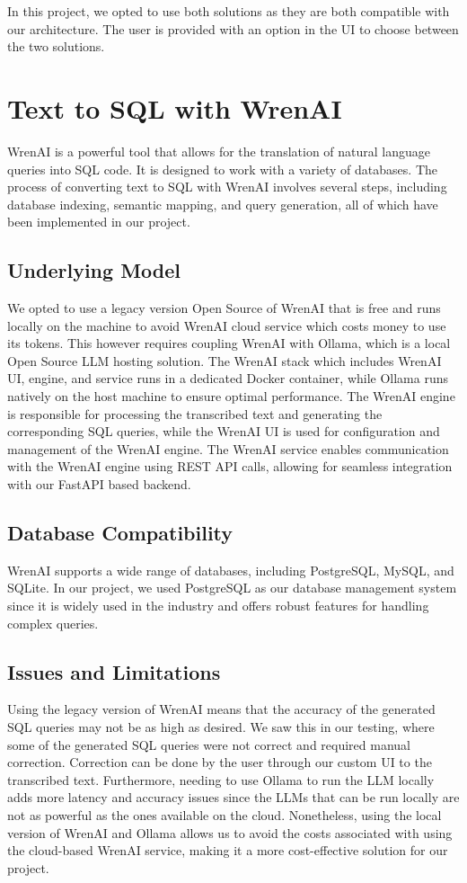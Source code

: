 \documentclass{article}
\begin{document}
In this project, we opted to use both solutions as they are both compatible with our architecture. The user is provided with an option in the UI to choose between the two solutions. 

\section{Text to SQL with WrenAI}
WrenAI is a powerful tool that allows for the translation of natural language queries into SQL code. It is designed to work with a variety of databases. The process of converting text to SQL with WrenAI involves several steps, including database indexing, semantic mapping, and query generation, all of which have been implemented in our project.

\subsection{Underlying Model}
We opted to use a legacy version Open Source of WrenAI that is free and runs locally on the machine to avoid WrenAI cloud service which costs money to use its tokens. This however requires coupling WrenAI with Ollama, which is a local Open Source LLM hosting solution. The WrenAI stack which includes WrenAI UI, engine, and service runs in a dedicated Docker container, while Ollama runs natively on the host machine to ensure optimal performance. The WrenAI engine is responsible for processing the transcribed text and generating the corresponding SQL queries, while the WrenAI UI is used for configuration and management of the WrenAI engine. The WrenAI service enables communication with the WrenAI engine using REST API calls, allowing for seamless integration with our FastAPI based backend. 

\subsection{Database Compatibility}
WrenAI supports a wide range of databases, including PostgreSQL, MySQL, and SQLite. In our project, we used PostgreSQL as our database management system since it is widely used in the industry and offers robust features for handling complex queries.

\subsection{Issues and Limitations}
Using the legacy version of WrenAI means that the accuracy of the generated SQL queries may not be as high as desired. We saw this in our testing, where some of the generated SQL queries were not correct and required manual correction. 
Correction can be done by the user through our custom UI to the transcribed text. 
Furthermore, needing to use Ollama to run the LLM locally adds more latency and accuracy issues since the LLMs that can be run locally are not as powerful as the ones available on the cloud. Nonetheless, using the local version of WrenAI and Ollama allows us to avoid the costs associated with using the cloud-based WrenAI service, making it a more cost-effective solution for our project.
\end{document}
